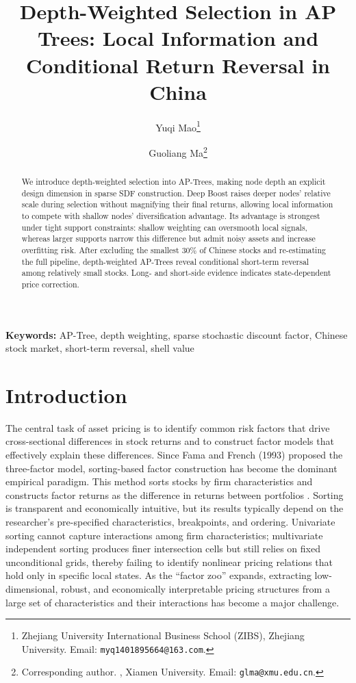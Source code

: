 \documentclass[12pt]{article}
\title{Depth-Weighted Selection in AP Trees: Local Information and Conditional Return Reversal in China}
\author{
Yuqi Mao\thanks{
Zhejiang University International Business School (ZIBS), Zhejiang University.
Email: \texttt{myq1401895664@163.com}.
}
\and
Guoliang Ma\thanks{
Corresponding author. , Xiamen University.
Email: \texttt{glma@xmu.edu.cn}.
}
}
\date{}
\begin{document}
\maketitle

\begin{abstract}

We introduce depth-weighted selection into AP-Trees, making node depth an explicit design dimension in sparse SDF construction. 
Deep Boost raises deeper nodes’ relative scale during selection without magnifying their final returns, allowing local information to compete with shallow nodes’ diversification advantage. 
Its advantage is strongest under tight support constraints: shallow weighting can oversmooth local signals, whereas larger supports narrow this difference but admit noisy assets and increase overfitting risk. 
After excluding the smallest $30\%$ of Chinese stocks and re-estimating the full pipeline, 
depth-weighted AP-Trees reveal conditional short-term reversal among relatively small stocks. Long- and short-side evidence indicates state-dependent price correction.

\end{abstract}

\noindent\textbf{Keywords:} AP-Tree, depth weighting, sparse stochastic discount factor, Chinese stock market, short-term reversal, shell value

\vspace{1em}
\clearpage

\section{Introduction}

The central task of asset pricing is to identify common risk factors that drive cross-sectional differences in stock returns and to construct factor models that effectively explain these differences. Since Fama and French (1993) proposed the three-factor model, sorting-based factor construction has become the dominant empirical paradigm. This method sorts stocks by firm characteristics and constructs factor returns as the difference in returns between portfolios \cite{ref3}. Sorting is transparent and economically intuitive, but its results typically depend on the researcher's pre-specified characteristics, breakpoints, and ordering. Univariate sorting cannot capture interactions among firm characteristics; multivariate independent sorting produces finer intersection cells but still relies on fixed unconditional grids, thereby failing to identify nonlinear pricing relations that hold only in specific local states. As the ``factor zoo'' expands, extracting low-dimensional, robust, and economically interpretable pricing structures from a large set of characteristics and their interactions has become a major challenge.
\end{document}
